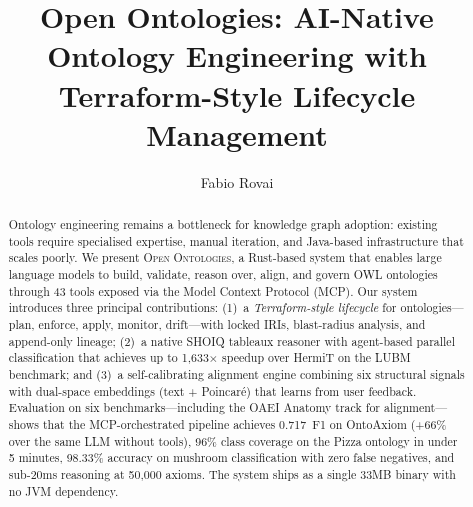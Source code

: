 \documentclass[runningheads]{llncs}
\begin{document}
\title{Open Ontologies: AI-Native Ontology Engineering with Terraform-Style Lifecycle Management}

\author{Fabio Rovai}

\maketitle

\begin{abstract}
Ontology engineering remains a bottleneck for knowledge graph adoption: existing tools require specialised expertise, manual iteration, and Java-based infrastructure that scales poorly. We present \textsc{Open Ontologies}, a Rust-based system that enables large language models to build, validate, reason over, align, and govern OWL ontologies through 43 tools exposed via the Model Context Protocol (MCP). Our system introduces three principal contributions: (1)~a \emph{Terraform-style lifecycle} for ontologies—plan, enforce, apply, monitor, drift—with locked IRIs, blast-radius analysis, and append-only lineage; (2)~a native SHOIQ tableaux reasoner with agent-based parallel classification that achieves up to 1{,}633$\times$ speedup over HermiT on the LUBM benchmark; and (3)~a self-calibrating alignment engine combining six structural signals with dual-space embeddings (text + Poincar\'e) that learns from user feedback. Evaluation on six benchmarks---including the OAEI Anatomy track for alignment---shows that the MCP-orchestrated pipeline achieves 0.717~F1 on OntoAxiom (+66\% over the same LLM without tools), 96\% class coverage on the Pizza ontology in under 5 minutes, 98.33\% accuracy on mushroom classification with zero false negatives, and sub-20ms reasoning at 50{,}000 axioms. The system ships as a single 33MB binary with no JVM dependency.

\end{abstract}


\end{document}
